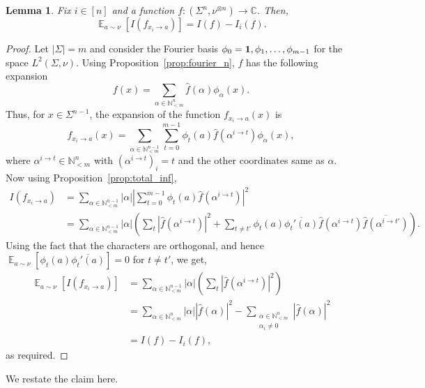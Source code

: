 \documentclass[11pt]{article}
\newtheorem{lemma}[thm]{Lemma}
\newcommand\card[1]{\left| {#1} \right|}
\newcommand\Expect[2]{{\mathop{\mathbb{E}}_{#1}\left[ {#2} \right]}}
\newcommand{\V}[1]{{#1}}
\begin{document}
    \begin{lemma}
    \label{lemma:split_f_total_inf}
        Fix $i\in [n]$ and a function $f: (\Sigma^n, \nu^{\otimes n}) \rightarrow \mathbb{C}$. Then,
        $$\Expect{a\sim \nu}{I(f_{x_i \rightarrow a})} = I(f) - I_i(f).$$
    \end{lemma}
\begin{proof}
Let $|\Sigma|= m$ and consider the Fourier basis $\phi_0 ={\bf 1}, \phi_1, \ldots, \phi_{m-1}$ for the space $L^2(\Sigma, \nu)$. Using Proposition~\ref{prop:fourier_n}, $f$ has the following expansion
$$f(\V x) = \sum_{\alpha \in \mathbb{N}^n_{<m}} \hat{f}(\alpha) \phi_{\alpha}(\V x).$$
Thus, for $\V x\in \Sigma^{n-1}$, the expansion of the function $f_{x_i \rightarrow a}(\V x)$ is
$$f_{x_i \rightarrow a}(\V x) = \sum_{\alpha \in \mathbb{N}^{n-1}_{<m}} \sum_{t=0}^{m-1} \phi_t(a)\hat{f}(\alpha^{i\rightarrow t}) \phi_{\alpha}(\V x),$$
where $\alpha^{i\rightarrow t} \in \mathbb{N}^n_{<m}$ with $(\alpha^{i\rightarrow t})_i = t$ and the other coordinates same as $\alpha$. Now using Proposition~\ref{prop:total_inf},
\begin{align*}
    I(f_{x_i \rightarrow a}) &= \sum_{\alpha \in \mathbb{N}^{n-1}_{<m}} \card{\alpha}\card{\sum_{t=0}^{m-1} \phi_t(a)\hat{f}(\alpha^{i\rightarrow t})}^2\\
    & = \sum_{\alpha \in \mathbb{N}^{n-1}_{<m}} \card{\alpha}\left( \sum_{t} \card{\hat{f}(\alpha^{i\rightarrow t})}^2 + \sum_{t\neq t'} \phi_t(a)\overline{\phi_t'(a)}\hat{f}(\alpha^{i\rightarrow t})\overline{\hat{f}(\alpha^{i\rightarrow t'})} \right).
\end{align*}
Using the fact that the characters are orthogonal, and hence $\Expect{a\sim \nu}{\phi_t(a)\overline{\phi_t'(a)}} = 0$ for $t\neq t'$, we get,
\begin{align*}
   \Expect{a\sim \nu}{ I(f_{x_i \rightarrow a})} &= \sum_{\alpha \in \mathbb{N}^{n-1}_{<m}} \card{\alpha}\left( \sum_{t} \card{\hat{f}(\alpha^{i\rightarrow t})}^2 \right)\\
   &= \sum_{\alpha \in \mathbb{N}^{n}_{<m}} \card{\alpha} \card{\hat{f}(\alpha)}^2  - \sum_{\substack{\alpha \in \mathbb{N}^{n}_{<m}\\ \alpha_i \neq 0}} \card{\hat{f}(\alpha)}^2 \\
   & = I(f) - I_i(f),
\end{align*}
as required.
\end{proof}

We restate the claim here.
\end{document}
